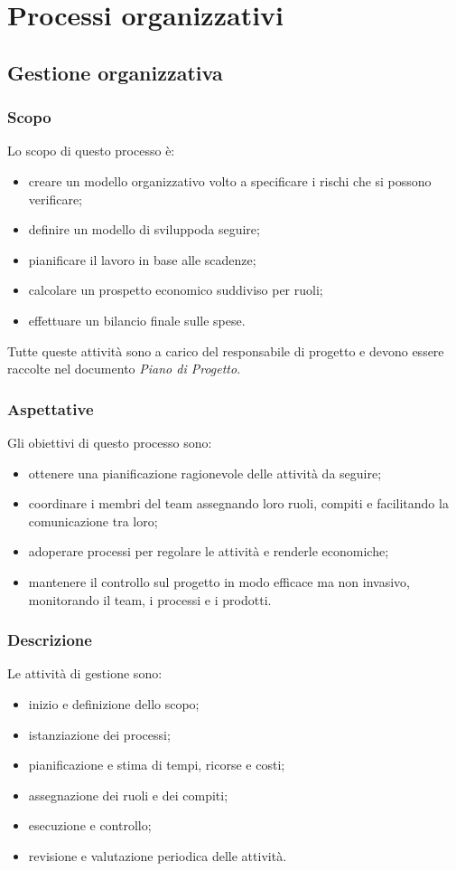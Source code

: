 \section{Processi organizzativi}
	\subsection{Gestione organizzativa}
		\subsubsection{Scopo}

		Lo scopo di questo processo è:
		\begin{itemize}
			\item creare un modello organizzativo volto a specificare i rischi che si possono verificare;
			\item definire un modello di sviluppo\glosp da seguire;
			\item pianificare il lavoro in base alle scadenze;
			\item calcolare un prospetto economico suddiviso per ruoli;
			\item effettuare un bilancio finale sulle spese.
		\end{itemize}
		Tutte queste attività sono a carico del responsabile di progetto e devono essere raccolte nel documento \textit{Piano di Progetto}.

		\subsubsection{Aspettative}
		Gli obiettivi di questo processo sono:
		\begin{itemize}
			\item ottenere una pianificazione ragionevole delle attività da seguire;
			\item coordinare i membri del team assegnando loro ruoli, compiti e facilitando la comunicazione tra loro;
			\item adoperare processi per regolare le attività e renderle economiche;
			\item mantenere il controllo sul progetto in modo efficace ma non invasivo, monitorando il team, i processi e i prodotti.
		\end{itemize}
		\subsubsection{Descrizione}
		Le attività di gestione sono:
		\begin{itemize}
			\item inizio e definizione dello scopo;
			\item istanziazione dei processi;
			\item pianificazione e stima di tempi, ricorse e costi;
			\item assegnazione dei ruoli e dei compiti;
			\item esecuzione e controllo;
			\item revisione e valutazione periodica delle attività.
		\end{itemize}
